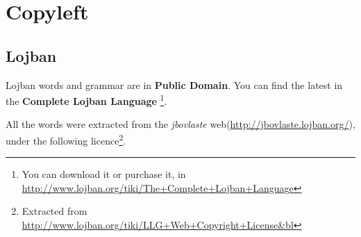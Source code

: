 \documentclass[ipa,twoside]{report}
\begin{document}
\label{cha:enloj}
\begin{multicols}{2}


\end{multicols}

\chapter*{Copyleft}

\pagestyle{plain}

\section*{Lojban}

Lojban words and grammar are in \textbf{Public Domain}. You can find the latest in the \textbf{Complete Lojban Language}%
\footnote{You can download it or purchase it, in \url{http://www.lojban.org/tiki/The+Complete+Lojban+Language}}.

All the words were extracted from the \textsl{jbovlaste} web(\url{http://jbovlaste.lojban.org/}), under the following licence\footnote{Extracted from \url{http://www.lojban.org/tiki/LLG+Web+Copyright+License&bl}}.
\end{document}
